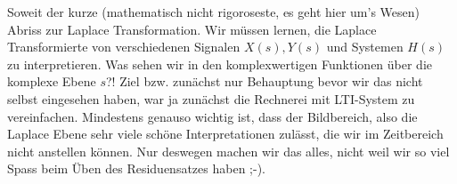 Soweit der kurze (mathematisch nicht rigoroseste, es geht hier um's Wesen)
Abriss zur Laplace Transformation.
Wir müssen lernen, die Laplace Transformierte von verschiedenen
Signalen $X(s), Y(s)$ und Systemen $H(s)$ zu interpretieren. Was sehen wir in den
komplexwertigen Funktionen über die komplexe Ebene $s$?!
Ziel bzw. zunächst nur Behauptung bevor wir das nicht selbst eingesehen haben,
war ja zunächst die Rechnerei mit LTI-System zu vereinfachen.
Mindestens genauso wichtig ist, dass der Bildbereich, also die Laplace Ebene
sehr viele schöne Interpretationen zulässt, die wir im Zeitbereich nicht
anstellen können. Nur deswegen machen wir das alles, nicht weil wir so viel
Spass beim Üben des Residuensatzes haben ;-).














\newpage
